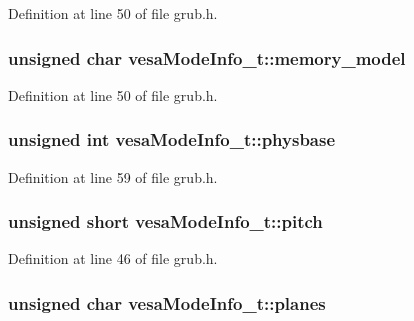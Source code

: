 Definition at line 50 of file grub.\+h.

\hypertarget{structvesaModeInfo__t_a3f6f4827e2c4d40d89a6e8ec6e15c8f4}{
\subsubsection[{memory\+\_\+model}]{\setlength{\rightskip}{0pt plus 5cm}unsigned char vesa\+Mode\+Info\+\_\+t\+::memory\+\_\+model}}\label{structvesaModeInfo__t_a3f6f4827e2c4d40d89a6e8ec6e15c8f4}


Definition at line 50 of file grub.\+h.

\hypertarget{structvesaModeInfo__t_a0233746f9f5f4ecab8622c3a08dc6f5c}{
\subsubsection[{physbase}]{\setlength{\rightskip}{0pt plus 5cm}unsigned int vesa\+Mode\+Info\+\_\+t\+::physbase}}\label{structvesaModeInfo__t_a0233746f9f5f4ecab8622c3a08dc6f5c}


Definition at line 59 of file grub.\+h.

\hypertarget{structvesaModeInfo__t_aed2e5dc0be6bd66efb67ab3de2191bfe}{
\subsubsection[{pitch}]{\setlength{\rightskip}{0pt plus 5cm}unsigned short vesa\+Mode\+Info\+\_\+t\+::pitch}}\label{structvesaModeInfo__t_aed2e5dc0be6bd66efb67ab3de2191bfe}


Definition at line 46 of file grub.\+h.

\hypertarget{structvesaModeInfo__t_a9d1ab189d261e008a41daa04d5ee9693}{
\subsubsection[{planes}]{\setlength{\rightskip}{0pt plus 5cm}unsigned char vesa\+Mode\+Info\+\_\+t\+::planes}}\label{structvesaModeInfo__t_a9d1ab189d261e008a41daa04d5ee9693}


